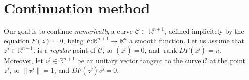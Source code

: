 \documentclass[11pt,reqno,twoside]{article}
\newcommand{\R}{\ensuremath{\mathbb{R}}}
\theoremstyle{remark}
\begin{document}
\title{}
\author{}
\date{}

\section{Continuation method}\label{sec:pseudoArc}
Our goal is to continue \emph{numerically} a curve $\mathcal{C}\subset\R^{n+1}$, defined
implicitely by the equation
       $F(z) = 0$,
being $F:\R^{n+1}\longrightarrow \R^{n}$ a smooth function. Let us assume
that $z^{j}\in\R^{n+1}$, is a \emph{regular} point of $\mathcal{C}$, so 
$\left(z^{j}\right) = 0$, and
  $\mathop{rank}DF\left(z^{j}\right) = n$.
Moreover, let $v^{j}\in\R^{n+1}$ be an unitary vector tangent to the curve
$\mathcal{C}$ at the point $z^{j}$, so 
  $\| v^{j}\| = 1$, and
  $DF\left(z^{j}\right) v^{j} = 0$.
\end{document}
